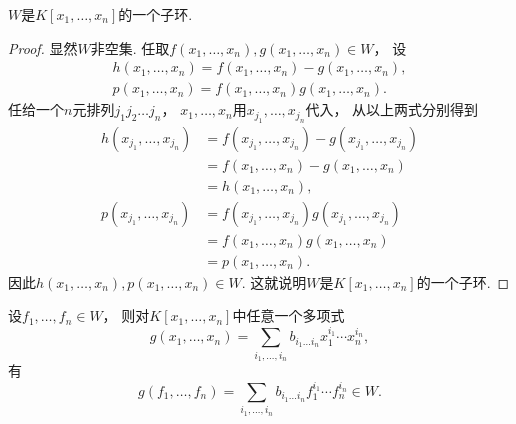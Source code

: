 \begin{proposition}
\(W\)是\(K[x_1,\dotsc,x_n]\)的一个子环.
\begin{proof}
显然\(W\)非空集.
任取\(f(x_1,\dotsc,x_n),g(x_1,\dotsc,x_n) \in W\)，
设\begin{gather*}
	h(x_1,\dotsc,x_n)
	=f(x_1,\dotsc,x_n)
	-g(x_1,\dotsc,x_n), \\
	p(x_1,\dotsc,x_n)
	=f(x_1,\dotsc,x_n)
	g(x_1,\dotsc,x_n).
\end{gather*}
任给一个\(n\)元排列\(j_1 j_2 \dotso j_n\)，
\(x_1,\dotsc,x_n\)用\(x_{j_1},\dotsc,x_{j_n}\)代入，
从以上两式分别得到\begin{align*}
	h(x_{j_1},\dotsc,x_{j_n})
	&=f(x_{j_1},\dotsc,x_{j_n})
	-g(x_{j_1},\dotsc,x_{j_n}) \\
	&=f(x_1,\dotsc,x_n)
	-g(x_1,\dotsc,x_n) \\
	&=h(x_1,\dotsc,x_n), \\
	p(x_{j_1},\dotsc,x_{j_n})
	&=f(x_{j_1},\dotsc,x_{j_n})
	g(x_{j_1},\dotsc,x_{j_n}) \\
	&=f(x_1,\dotsc,x_n)
	g(x_1,\dotsc,x_n) \\
	&=p(x_1,\dotsc,x_n).
\end{align*}
因此\(h(x_1,\dotsc,x_n),p(x_1,\dotsc,x_n) \in W\).
这就说明\(W\)是\(K[x_1,\dotsc,x_n]\)的一个子环.
\end{proof}
\end{proposition}

\begin{proposition}
设\(f_1,\dotsc,f_n \in W\)，
则对\(K[x_1,\dotsc,x_n]\)中任意一个多项式\begin{equation*}
	g(x_1,\dotsc,x_n)
	=\sum_{i_1,\dotsc,i_n}
	b_{i_1 \dotso i_n}
	x_1^{i_1} \dotsm x_n^{i_n},
\end{equation*}
有\begin{equation*}
	g(f_1,\dotsc,f_n)
	=\sum_{i_1,\dotsc,i_n}
	b_{i_1 \dotso i_n}
	f_1^{i_1} \dotsm f_n^{i_n}
	\in W.
\end{equation*}
\end{proposition}

